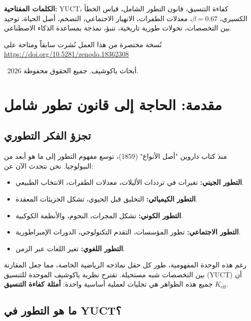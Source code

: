 \documentclass[11pt,a4paper]{article}
\newcommand{\Keff}{K_{\mathrm{eff}}}
\begin{document}
	\vspace{0.1cm}
	\noindent
	{\color{darkblue}\textbf{الكلمات المفتاحية:}} YUCT، كفاءة التنسيق، قانون التطور الشامل، قياس الخطأ الكسيري، \(\beta=0.67\)، معدلات الطفرات، الانهيار الاجتماعي، التضخم، أصل الحياة، توحيد بين التخصصات، تحولات طورية تاريخية، تنبؤ، نمذجة بمساعدة الذكاء الاصطناعي.
	
	\vspace{0.5cm}
	\noindent
	{\small نُسخة مختصرة من هذا العمل نُشرت سابقاً ومتاحة على \\ \url{https://doi.org/10.5281/zenodo.18362308}}
	\vspace{0.5cm}
	
	\noindent
	\textcopyright\ 2026 أبحاث ياكوشيف. جميع الحقوق محفوظة.
	
	\tableofcontents
	\newpage
	
	\section{مقدمة: الحاجة إلى قانون تطور شامل}
	
	\subsection{تجزؤ الفكر التطوري}
	
	منذ كتاب داروين "أصل الأنواع" (1859)، توسع مفهوم التطور إلى ما هو أبعد من البيولوجيا. نحن نتحدث الآن عن:
	
	\begin{itemize}
		\item \textbf{التطور الجيني:} تغيرات في ترددات الأليلات، معدلات الطفرات، الانتخاب الطبيعي.
		\item \textbf{التطور الكيميائي:} التخليق قبل الحيوي، تشكل الجزيئات المعقدة.
		\item \textbf{التطور الكوني:} تشكل المجرات، النجوم، والأنظمة الكوكبية.
		\item \textbf{التطور الاجتماعي:} تطور المؤسسات، التقدم التكنولوجي، الدورات الإمبراطورية.
		\item \textbf{التطور اللغوي:} تغير اللغات عبر الزمن.
	\end{itemize}
	
	رغم هذه الوحدة المفهومية، طور كل حقل نماذجه الرياضية الخاصة، مما جعل المقارنة بين التخصصات شبه مستحيلة. تقترح نظرية ياكوشيف الموحدة للتنسيق (YUCT) أن جميع هذه الظواهر هي تجليات لعملية أساسية واحدة: \textbf{أمثلة كفاءة التنسيق} \(\Keff\).
	
	\subsection{ما هو التطور في YUCT؟}
	
\end{document}
